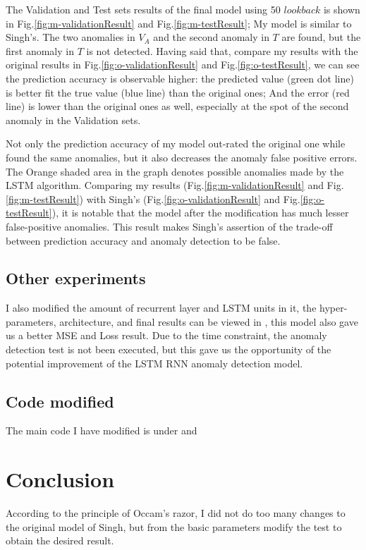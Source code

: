 \documentclass{article}
\begin{document}
The Validation and Test sets results of the final model using 50 $lookback$ is
shown in Fig.\ref{fig:m-validationResult} and Fig.\ref{fig:m-testResult}; My
model is similar to Singh's. The two anomalies in $V_A$ and the second anomaly
in $T$ are found, but the first anomaly in $T$ is not detected. Having said
that, compare my results with the original results in
Fig.\ref{fig:o-validationResult} and Fig.\ref{fig:o-testResult}, we can see
the prediction accuracy is observable higher: the predicted value (green dot
line) is better fit the true value (blue line) than the original ones; And the
error (red line) is lower than the original ones as well, especially at the
spot of the second anomaly in the Validation sets.

Not only the prediction accuracy of my model out-rated the original one while
found the same anomalies, but it also decreases the anomaly false positive
errors. The Orange shaded area in the graph denotes possible anomalies made by
the LSTM algorithm. Comparing my results (Fig.\ref{fig:m-validationResult} and
Fig.\ref{fig:m-testResult}) with Singh's (Fig.\ref{fig:o-validationResult} and
Fig.\ref{fig:o-testResult}), it is notable that the model after the
modification
has much lesser false-positive anomalies. This result makes Singh's assertion
of
the trade-off between prediction accuracy and anomaly detection to be false. 

\subsection{Other experiments}
I also modified the amount of recurrent layer and LSTM units in it, the
hyper-parameters, architecture, and final results can be viewed in
, this model also gave us a better
MSE and Loss result. Due to the time constraint, the anomaly detection test
is not been executed, but this gave us the opportunity of the potential
improvement of the LSTM RNN anomaly detection model.

\subsection{Code modified}
The main code I have modified is under
 and


\section{Conclusion}
According to the principle of Occam's razor, I did not do too many changes to
the original model of Singh, but from the basic parameters modify the test to
obtain the desired result. 
\end{document}
